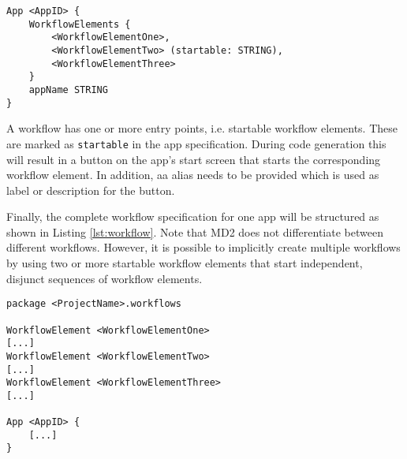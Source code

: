 \begin{lstlisting}[language=MD2, label=lst:app, caption=App Definition in MD2]
App <AppID> {
	WorkflowElements {
		<WorkflowElementOne>,
		<WorkflowElementTwo> (startable: STRING),
		<WorkflowElementThree> 
	}
	appName STRING
}
\end{lstlisting}

A workflow has one or more entry points, i.e. startable workflow elements. These are marked as {\lstinline!startable!} in the app specification. During code generation this will result in a button on the app's start screen that starts the corresponding workflow element. In addition, aa alias needs to be provided which is used as label or description for the button.

Finally, the complete workflow specification for one app will be structured as shown in Listing \ref{lst:workflow}. Note that MD2 does not differentiate between different workflows. However, it is possible to implicitly create multiple workflows by using two or more startable workflow elements that start independent, disjunct sequences of workflow elements.

\begin{lstlisting}[language=MD2, label=lst:workflow, caption=Workflow Definition in MD2]
package <ProjectName>.workflows

WorkflowElement <WorkflowElementOne>
[...]
WorkflowElement <WorkflowElementTwo>
[...]
WorkflowElement <WorkflowElementThree>
[...]

App <AppID> {
	[...]
}
\end{lstlisting}